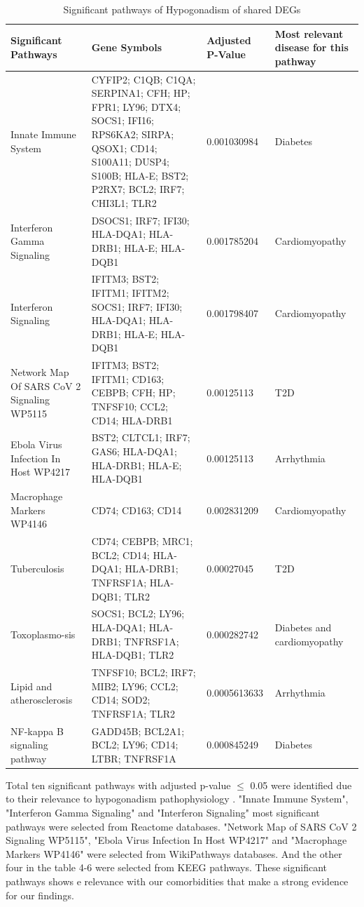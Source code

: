 \begin{longtable}{|p{2cm}|p{5cm}|p{2cm}|p{4cm}|}
    \caption[Significant pathways of Hypogonadism of shared DEGs]{Significant pathways of Hypogonadism of shared DEGs}\label{tab:significant_pathways_hypogonadism} \\
    \hline
    Significant Pathways & Gene Symbols & Adjusted P-Value & Most relevant disease for this pathway \\
    \hline
    Innate Immune System & CYFIP2; C1QB; C1QA;  SERPINA1;  CFH; HP; FPR1; LY96; DTX4;  SOCS1; IFI16; RPS6KA2; SIRPA;  QSOX1; CD14; S100A11;  DUSP4; S100B; HLA-E; BST2; P2RX7; BCL2; IRF7;  CHI3L1; TLR2 & 0.001030984 & Diabetes \\
    \hline
    Interferon Gamma Signaling & DSOCS1; IRF7; IFI30; HLA-DQA1; HLA-DRB1; HLA-E; HLA-DQB1 & 0.001785204 & Cardiomyopathy \\
    \hline
    Interferon Signaling & IFITM3; BST2; IFITM1; IFITM2;  SOCS1; IRF7; IFI30; HLA-DQA1; HLA-DRB1; HLA-E; HLA-DQB1 & 0.001798407 & Cardiomyopathy \\
    \hline
    Network Map Of SARS CoV 2 Signaling WP5115 & IFITM3; BST2; IFITM1;  CD163; CEBPB; CFH; HP;  TNFSF10;  CCL2;  CD14; HLA-DRB1 & 0.00125113 & T2D \\
    \hline
    Ebola Virus Infection In Host WP4217 & BST2; CLTCL1; IRF7; GAS6; HLA-DQA1; HLA-DRB1; HLA-E; HLA-DQB1 & 0.00125113 & Arrhythmia \\
    \hline
    Macrophage Markers WP4146 & CD74; CD163; CD14 & 0.002831209 & Cardiomyopathy \\
    \hline
    Tuberculosis & CD74; CEBPB; MRC1; BCL2;  CD14; HLA-DQA1; HLA-DRB1; TNFRSF1A; HLA-DQB1; TLR2 & 0.00027045 & T2D \\
    \hline
    Toxoplasmo-sis & SOCS1; BCL2; LY96; HLA-DQA1; HLA-DRB1; TNFRSF1A; HLA-DQB1; TLR2 & 0.000282742 & Diabetes and cardiomyopathy \\
    \hline
    Lipid and atherosclerosis & TNFSF10; BCL2; IRF7; MIB2;  LY96; CCL2; CD14; SOD2;  TNFRSF1A; TLR2 & 0.0005613633 & Arrhythmia \\
    \hline
    NF-kappa B signaling pathway & GADD45B; BCL2A1; BCL2;  LY96; CD14; LTBR; TNFRSF1A & 0.000845249 & Diabetes \\
    \hline
\end{longtable}

Total ten significant pathways with adjusted p-value $\leq$ 0.05 were identified due to their relevance to hypogonadism pathophysiology \cite{6}. "Innate Immune System", "Interferon Gamma Signaling" and "Interferon Signaling" most significant pathways were selected from Reactome databases. "Network Map of SARS CoV 2 Signaling WP5115", "Ebola Virus Infection In Host WP4217" and "Macrophage Markers WP4146" were selected from WikiPathways databases. And the other four in the table 4-6 were selected from KEEG pathways. These significant pathways shows e relevance with our comorbidities that make a strong evidence for our findings.\\

